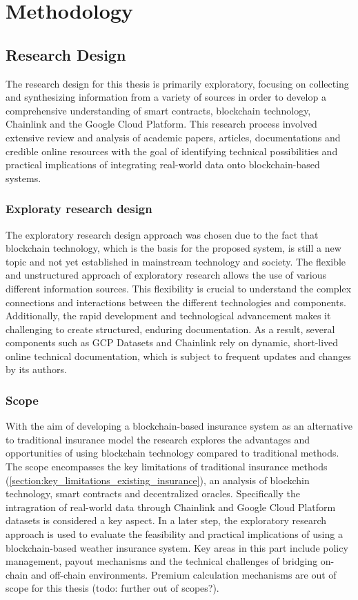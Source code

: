 \chapter{Methodology}\label{chapter:methodology}
\section{Research Design}\label{section:research_design}

The research design for this thesis is primarily exploratory, focusing on collecting and synthesizing information from a variety of sources in order to develop a comprehensive understanding of smart contracts, blockchain technology, Chainlink and the Google Cloud Platform. This research process involved extensive review and analysis of academic papers, articles, documentations and credible online resources with the goal of identifying technical possibilities and practical implications of integrating real-world data onto blockchain-based systems.

\subsection{Exploraty research design}
The exploratory research design approach was chosen due to the fact that blockchain technology, which is the basis for the proposed system, is still a new topic and not yet established in mainstream technology and society. The flexible and unstructured approach of exploratory research allows the use of various different information sources. This flexibility is crucial to understand the complex connections and interactions between the different technologies and components. Additionally, the rapid development and technological advancement makes it challenging to create structured, enduring documentation. As a result, several components such as GCP Datasets and Chainlink rely on dynamic, short-lived online technical documentation, which is subject to frequent updates and changes by its authors. \autocite{kicsi2022exploratory}

\subsection{Scope}
With the aim of developing a blockchain-based insurance system as an alternative to traditional insurance model the research explores the advantages and opportunities of using blockchain technology compared to traditional methods. The scope encompasses the key limitations of traditional insurance methods (\cref{section:key_limitations_existing_insurance}), an analysis of blockchin technology, smart contracts and decentralized oracles. Specifically the intragration of real-world data through Chainlink and Google Cloud Platform datasets is considered a key aspect. In a later step, the exploratory research approach is used to evaluate the feasibility and practical implications of using a blockchain-based weather insurance system. Key areas in this part include policy management, payout mechanisms and the technical challenges of bridging on-chain and off-chain environments. Premium calculation mechanisms are out of scope for this thesis (todo: further out of scopes?).

